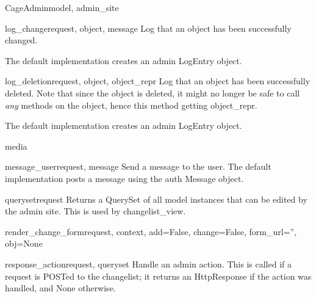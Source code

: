 \documentclass[letterpaper,10pt,english]{sphinxmanual}
\begin{document}
\begin{classdesc}{CageAdmin}{model, admin\_site}
\hypertarget{animal.admin.CageAdmin.log_change}{}\begin{methoddesc}{log\_change}{request, object, message}
Log that an object has been successfully changed.

The default implementation creates an admin LogEntry object.
\end{methoddesc}

\hypertarget{animal.admin.CageAdmin.log_deletion}{}\begin{methoddesc}{log\_deletion}{request, object, object\_repr}
Log that an object has been successfully deleted. Note that since the
object is deleted, it might no longer be safe to call \emph{any} methods
on the object, hence this method getting object\_repr.

The default implementation creates an admin LogEntry object.
\end{methoddesc}

\hypertarget{animal.admin.CageAdmin.media}{}\begin{memberdesc}{media}\end{memberdesc}

\hypertarget{animal.admin.CageAdmin.message_user}{}\begin{methoddesc}{message\_user}{request, message}
Send a message to the user. The default implementation
posts a message using the auth Message object.
\end{methoddesc}

\hypertarget{animal.admin.CageAdmin.queryset}{}\begin{methoddesc}{queryset}{request}
Returns a QuerySet of all model instances that can be edited by the
admin site. This is used by changelist\_view.
\end{methoddesc}

\hypertarget{animal.admin.CageAdmin.render_change_form}{}\begin{methoddesc}{render\_change\_form}{request, context, add=False, change=False, form\_url='', obj=None}\end{methoddesc}

\hypertarget{animal.admin.CageAdmin.response_action}{}\begin{methoddesc}{response\_action}{request, queryset}
Handle an admin action. This is called if a request is POSTed to the
changelist; it returns an HttpResponse if the action was handled, and
None otherwise.
\end{methoddesc}


\end{classdesc}
\end{document}
